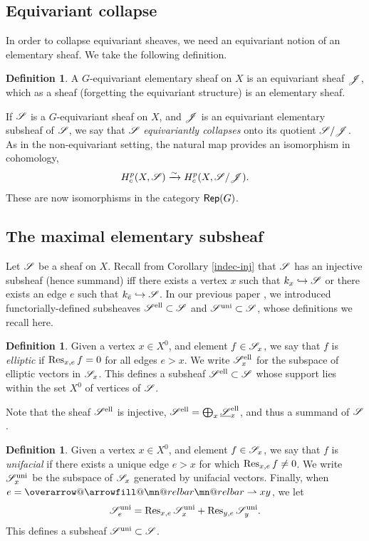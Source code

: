 \documentclass[letter]{amsart}
\makeatletter
\theoremstyle{definition}
\newtheorem{definition}[thm]{Definition}
\theoremstyle{remark}
\numberwithin{thm}{section}
\numberwithin{equation}{section}
\DeclareRobustCommand{\overrightharpoon}{\mathpalette{\overarrow@\rightharpoonfill@}}
\def\rightharpoonfill@{\arrowfill@\mn@relbar\mn@relbar\rightharpoonup}
\newcommand{\edge}[1]{\overrightharpoon{#1}}
\newcommand{\constsheaf}[1]{{\underline{#1}}}
\DeclareMathOperator{\uni}{uni}
\DeclareMathOperator{\el}{ell}
\makeatother
\begin{document}
\subsection{Equivariant collapse}

In order to collapse equivariant sheaves, we need an equivariant notion of an elementary sheaf.  We take the following definition.
\begin{definition}
A $G$-equivariant elementary  sheaf on $X$ is an equivariant sheaf ${\mathscr{J}}$, which as a sheaf (forgetting the equivariant structure) is an elementary sheaf.
\end{definition}

If ${\mathscr{S}}$ is a $G$-equivariant sheaf on $X$, and ${\mathscr{J}}$ is an equivariant elementary subsheaf of ${\mathscr{S}}$, we say that ${\mathscr{S}}$ {\em equivariantly collapses} onto its quotient ${\mathscr{S}} / {\mathscr{J}}$.  As in the non-equivariant setting, the natural map provides an isomorphism in cohomology,
$$H_c^p(X, {\mathscr{S}}) \xrightarrow{\sim} H_c^p(X, {\mathscr{S}} / {\mathscr{J}}).$$
These are now isomorphisms in the category ${\mathsf{Rep}}(G)$.

\subsection{The maximal elementary subsheaf}

Let ${\mathscr{S}}$ be a sheaf on $X$.  Recall from Corollary \ref{indec-inj} that ${\mathscr{S}}$ has an injective subsheaf (hence summand) iff there exists a vertex $x$ such that $k_{x} \hookrightarrow {\mathscr{S}}$ or there exists an edge $e$ such that $k_{\bar e} \hookrightarrow {\mathscr{S}}$.  In our previous paper \cite{MWInd}, we introduced functorially-defined subsheaves $\sheaf{S}^{\el} \subset \sheaf{S}$ and  $\sheaf{S}^{\uni} \subset \sheaf{S}$, whose definitions we recall here.

\begin{definition}
Given a vertex $x \in X^0$, and element $f \in {\mathscr{S}}_x$, we say that $f$ is {\em elliptic} if $\operatorname{Res}_{x,e} f = 0$ for all edges $e > x$.  We write $\sheaf{S}_x^{\el}$ for the subspace of elliptic vectors in ${\mathscr{S}}_x$.  This defines a subsheaf $\sheaf{S}^{\el} \subset \sheaf{S}$ whose support lies within the set $X^0$ of vertices of ${\mathscr{S}}$.
\end{definition}
Note that the sheaf $\sheaf{S}^{\el}$ is injective, $\sheaf{S}^{\el} = \bigoplus_x \constsheaf{\sheaf{S}}_x^{\el}$, and thus a summand of ${\mathscr{S}}$.

\begin{definition}
Given a vertex $x \in X^0$, and element $f \in {\mathscr{S}}_x$, we say that $f$ is {\em unifacial} if there exists a unique edge $e > x$ for which $\operatorname{Res}_{x,e} f \neq 0$.  We write $\sheaf{S}_x^{\uni}$ be the subspace of ${\mathscr{S}}_x$ generated by unifacial vectors.  Finally, when $e = \edge{xy}$, we let 
$$\sheaf{S}_e^{\uni} = \Res_{x,e} \sheaf{S}_x^{\uni} + \Res_{y,e} \sheaf{S}_y^{\uni}.$$
This defines a subsheaf $\sheaf{S}^{\uni} \subset \sheaf{S}$.
\end{definition}
\end{document}
